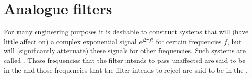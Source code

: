 

\section{Analogue filters} \label{sec:analogue-filters}



For many engineering purposes it is desirable to construct systems that will  (have little affect on) a complex exponential signal $e^{j2\pi f t}$ for certain frequencies $f$, but will  (significantly attenuate) these signals for other frequencies.  Such systems are called .  Those frequencies that the filter intends to pass unaffected are said to be in the  and those frequencies that the filter intends to reject are said to be in the .


